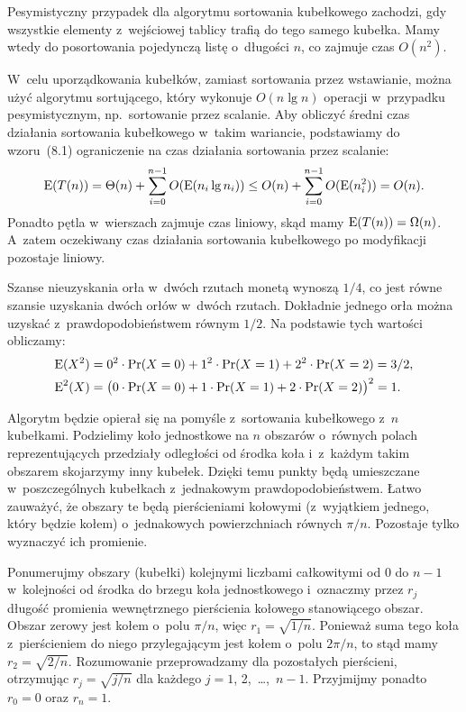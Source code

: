 \exercise %
Pesymistyczny przypadek dla algorytmu sortowania kubełkowego zachodzi, gdy wszystkie elementy z~wejściowej tablicy trafią do tego samego kubełka.
Mamy wtedy do posortowania pojedynczą listę o~długości $n$, co zajmuje czas $O(n^2)$.

W~celu uporządkowania kubełków, zamiast sortowania przez wstawianie, można użyć algorytmu sortującego, który wykonuje $O(n\lg n)$ operacji w~przypadku pesymistycznym, np.\ sortowanie przez scalanie.
Aby obliczyć średni czas działania sortowania kubełkowego w~takim wariancie, podstawiamy do wzoru~(8.1) ograniczenie na czas działania sortowania przez scalanie:
\[
	\operatorname{E}(T(n)) = \Theta(n)+\sum_{i=0}^{n-1}O(\operatorname{E}(n_i\lg n_i)) \le O(n)+\sum_{i=0}^{n-1}O(\operatorname{E}(n_i^2)) = O(n).
\]
Ponadto pętla  w~wierszach  zajmuje czas liniowy, skąd mamy $\operatorname{E}(T(n))=\Omega(n)$.
A~zatem oczekiwany czas działania sortowania kubełkowego po modyfikacji pozostaje liniowy.

\exercise %
Szanse nieuzyskania orła w~dwóch rzutach monetą wynoszą $1/4$, co jest równe szansie uzyskania dwóch orłów w~dwóch rzutach.
Dokładnie jednego orła można uzyskać z~prawdopodobieństwem równym $1/2$.
Na podstawie tych wartości obliczamy:
\begin{align*}
	\operatorname{E}(X^2) &= 0^2\cdot\Pr(X=0)+1^2\cdot\Pr(X=1)+2^2\cdot\Pr(X=2) = 3/2, \\
	\operatorname{E}^2(X) &= \bigl(0\cdot\Pr(X=0)+1\cdot\Pr(X=1)+2\cdot\Pr(X=2)\bigr)^2 = 1.
\end{align*}

\exercise %
Algorytm będzie opierał się na pomyśle z~sortowania kubełkowego z~$n$ kubełkami.
Podzielimy koło jednostkowe na $n$ obszarów o~równych polach reprezentujących przedziały odległości od środka koła i~z~każdym takim obszarem skojarzymy inny kubełek.
Dzięki temu punkty będą umieszczane w~poszczególnych kubełkach z~jednakowym prawdopodobieństwem.
Łatwo zauważyć, że obszary te będą pierścieniami kołowymi (z~wyjątkiem jednego, który będzie kołem) o~jednakowych powierzchniach równych $\pi/n$.
Pozostaje tylko wyznaczyć ich promienie.

Ponumerujmy obszary (kubełki) kolejnymi liczbami całkowitymi od 0 do $n-1$ w~kolejności od środka do brzegu koła jednostkowego i~oznaczmy przez $r_j$ długość promienia wewnętrznego pierścienia kołowego stanowiącego  obszar.
Obszar zerowy jest kołem o~polu $\pi/n$, więc $r_1=\sqrt{1/n}$.
Ponieważ suma tego koła z~pierścieniem do niego przylegającym jest kołem o~polu $2\pi/n$, to stąd mamy $r_2=\sqrt{2/n}$.
Rozumowanie przeprowadzamy dla pozostałych pierścieni, otrzymując $r_j=\sqrt{j/n}$ dla każdego $j=1$, 2,~\dots,~$n-1$.
Przyjmijmy ponadto $r_0=0$ oraz $r_n=1$.


